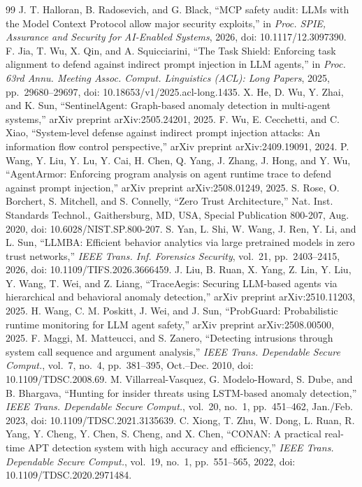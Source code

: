 \documentclass[journal]{IEEEtran}
\theoremstyle{remark}
\begin{document}
\begin{thebibliography}{99}
 J. T. Halloran, B. Radosevich, and G. Black, ``MCP safety audit: LLMs with the Model Context Protocol allow major security exploits,'' in \emph{Proc. SPIE, Assurance and Security for AI-Enabled Systems}, 2026, doi: 10.1117/12.3097390.
 F. Jia, T. Wu, X. Qin, and A. Squicciarini, ``The Task Shield: Enforcing task alignment to defend against indirect prompt injection in LLM agents,'' in \emph{Proc. 63rd Annu. Meeting Assoc. Comput. Linguistics (ACL): Long Papers}, 2025, pp.~29680--29697, doi: 10.18653/v1/2025.acl-long.1435.
 X. He, D. Wu, Y. Zhai, and K. Sun, ``SentinelAgent: Graph-based anomaly detection in multi-agent systems,'' arXiv preprint arXiv:2505.24201, 2025.
 F. Wu, E. Cecchetti, and C. Xiao, ``System-level defense against indirect prompt injection attacks: An information flow control perspective,'' arXiv preprint arXiv:2409.19091, 2024.
 P. Wang, Y. Liu, Y. Lu, Y. Cai, H. Chen, Q. Yang, J. Zhang, J. Hong, and Y. Wu, ``AgentArmor: Enforcing program analysis on agent runtime trace to defend against prompt injection,'' arXiv preprint arXiv:2508.01249, 2025.
 S. Rose, O. Borchert, S. Mitchell, and S. Connelly, ``Zero Trust Architecture,'' Nat. Inst. Standards Technol., Gaithersburg, MD, USA, Special Publication 800-207, Aug. 2020, doi: 10.6028/NIST.SP.800-207.
 S. Yan, L. Shi, W. Wang, J. Ren, Y. Li, and L. Sun, ``LLMBA: Efficient behavior analytics via large pretrained models in zero trust networks,'' \emph{IEEE Trans. Inf. Forensics Security}, vol.~21, pp.~2403--2415, 2026, doi: 10.1109/TIFS.2026.3666459.
 J. Liu, B. Ruan, X. Yang, Z. Lin, Y. Liu, Y. Wang, T. Wei, and Z. Liang, ``TraceAegis: Securing LLM-based agents via hierarchical and behavioral anomaly detection,'' arXiv preprint arXiv:2510.11203, 2025.
 H. Wang, C. M. Poskitt, J. Wei, and J. Sun, ``ProbGuard: Probabilistic runtime monitoring for LLM agent safety,'' arXiv preprint arXiv:2508.00500, 2025.
 F. Maggi, M. Matteucci, and S. Zanero, ``Detecting intrusions through system call sequence and argument analysis,'' \emph{IEEE Trans. Dependable Secure Comput.}, vol.~7, no.~4, pp.~381--395, Oct.--Dec. 2010, doi: 10.1109/TDSC.2008.69.
 M. Villarreal-Vasquez, G. Modelo-Howard, S. Dube, and B. Bhargava, ``Hunting for insider threats using LSTM-based anomaly detection,'' \emph{IEEE Trans. Dependable Secure Comput.}, vol.~20, no.~1, pp.~451--462, Jan./Feb. 2023, doi: 10.1109/TDSC.2021.3135639.
 C. Xiong, T. Zhu, W. Dong, L. Ruan, R. Yang, Y. Cheng, Y. Chen, S. Cheng, and X. Chen, ``CONAN: A practical real-time APT detection system with high accuracy and efficiency,'' \emph{IEEE Trans. Dependable Secure Comput.}, vol.~19, no.~1, pp.~551--565, 2022, doi: 10.1109/TDSC.2020.2971484.

\end{thebibliography}
\end{document}
